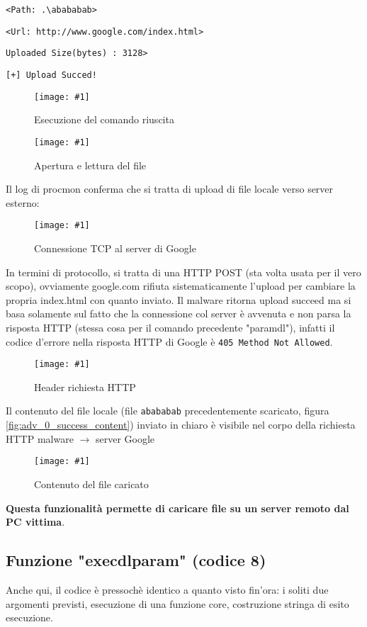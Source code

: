 \documentclass[
    a4paper, %
    11pt %
]{article}
\newcommand{\pic}[4]{\begin{figure}[H]
            \centering
            \texttt{[image: \#1]}
            \caption{#2}
            \label{fig:#1}
            \end{figure}}
\begin{document}
            \texttt{<Path: .\textbackslash abababab>}
            
            \texttt{<Url: http://www.google.com/index.html>}
            
            \texttt{Uploaded Size(bytes) : 3128>}
            
            \texttt{[+] Upload Succed!}
            
            \pic{adv_1_exec_ok}{Esecuzione del comando riuscita}{19cm}{1cm}

            \pic{adv_1_procmon_0}{Apertura e lettura del file}{15cm}{3cm}

            Il log di procmon conferma che si tratta di upload di file locale verso server esterno:

            \pic{adv_1_procmon}{Connessione TCP al server di Google}{17cm}{3cm}

            In termini di protocollo, si tratta di una HTTP POST (sta volta usata per il vero scopo), ovviamente
            google.com rifiuta sistematicamente l'upload per cambiare la propria index.html con quanto inviato.
            Il malware ritorna upload succeed ma si basa solamente sul fatto che la connessione col server
            è avvenuta e non parsa la risposta HTTP (stessa cosa per il comando precedente "paramdl"),
            infatti il codice d'errore nella risposta HTTP di Google è \texttt{405 Method Not Allowed}.

            \pic{adv_1_wireshark_0}{Header richiesta HTTP}{19cm}{6cm}

            Il contenuto del file locale (file \texttt{abababab} precedentemente scaricato, figura 
            \ref{fig:adv_0_success_content})
            inviato in chiaro è visibile nel corpo della richiesta HTTP malware $
            \rightarrow$ server Google

            \pic{adv_1_wireshark_1}{Contenuto del file caricato}{19cm}{8cm}

            \textbf{Questa funzionalità permette di caricare file su un server remoto dal PC vittima}.

            \subsection{Funzione "execdlparam" (codice 8)}

            Anche qui, il codice è pressochè identico a quanto visto fin'ora: i soliti due argomenti
            previsti, esecuzione di una funzione core, costruzione stringa di esito esecuzione.
\end{document}
